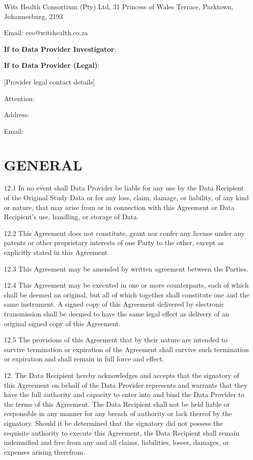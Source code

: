 Wits Health Consortium (Pty) Ltd, 31 Princess of Wales Terrace, Parktown, Johannesburg, 2193

Email: ceo@witshealth.co.za

\textbf{If to Data Provider Investigator}:

\textbf{If to Data Provider (Legal)}:

[Provider legal contact details]

Attention:

Address:

Email:

\section{GENERAL}

12.1 In no event shall Data Provider be liable for any use by the Data Recipient of the Original Study Data or for any loss, claim, damage, or liability, of any kind or nature, that may arise from or in connection with this Agreement or Data Recipient's use, handling, or storage of Data.

12.2 This Agreement does not constitute, grant nor confer any license under any patents or other proprietary interests of one Party to the other, except as explicitly stated in this Agreement.

12.3 This Agreement may be amended by written agreement between the Parties.

12.4 This Agreement may be executed in one or more counterparts, each of which shall be deemed an original, but all of which together shall constitute one and the same instrument. A signed copy of this Agreement delivered by electronic transmission shall be deemed to have the same legal effect as delivery of an original signed copy of this Agreement.

12.5 The provisions of this Agreement that by their nature are intended to survive termination or expiration of the Agreement shall survive such termination or expiration and shall remain in full force and effect.


12. The Data Recipient hereby acknowledges and accepts that the signatory of this Agreement on behalf of the Data Provider represents and warrants that they have the full authority and capacity to enter into and bind the Data Provider to the terms of this Agreement. The Data Recipient shall not be held liable or responsible in any manner for any breach of authority or lack thereof by the signatory. Should it be determined that the signatory did not possess the requisite authority to execute this Agreement, the Data Recipient shall remain indemnified and free from any and all claims, liabilities, losses, damages, or expenses arising therefrom.

